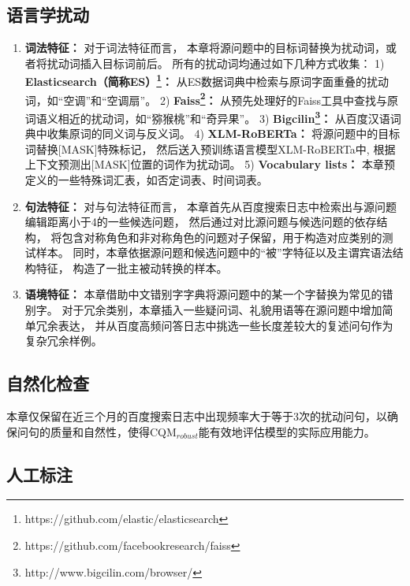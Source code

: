 \subsection{语言学扰动}

\begin{enumerate}
\item \textbf{词法特征：}
对于词法特征而言，
本章将源问题中的目标词替换为扰动词，或者将扰动词插入目标词前后。
所有的扰动词均通过如下几种方式收集：  
1) \textbf{Elasticsearch（简称ES）\footnote{https://github.com/elastic/elasticsearch}：}
从ES数据词典中检索与原词字面重叠的扰动词，如{\kai“空调”}和{\kai“空调扇”}。
2) \textbf{Faiss\footnote{https://github.com/facebookresearch/faiss}：}
从预先处理好的Faiss工具中查找与原词语义相近的扰动词，如{\kai“猕猴桃”}和{\kai“奇异果”}。
3) \textbf{Bigcilin\footnote{http://www.bigcilin.com/browser/}：}
从百度汉语词典中收集原词的同义词与反义词。
4) \textbf{XLM-RoBERTa\cite{conneau2019unsupervised}：}
将源问题中的目标词替换[MASK]特殊标记，
然后送入预训练语言模型XLM-RoBERTa中,
根据上下文预测出[MASK]位置的词作为扰动词。
5) \textbf{Vocabulary lists：}
本章预定义的一些特殊词汇表，如否定词表、时间词表。

\item \textbf{句法特征：}
对与句法特征而言，
本章首先从百度搜索日志中检索出与源问题编辑距离小于4的一些候选问题，
然后通过对比源问题与候选问题的依存结构，
将包含对称角色和非对称角色的问题对子保留，用于构造对应类别的测试样本。
同时，本章依据源问题和候选问题中的{\kai“被”}字特征以及主谓宾语法结构特征，
构造了一批主被动转换的样本。

\item \textbf{语境特征：}
本章借助中文错别字字典将源问题中的某一个字替换为常见的错别字。
对于冗余类别，本章插入一些疑问词、礼貌用语等在源问题中增加简单冗余表达，
并从百度高频问答日志中挑选一些长度差较大的复述问句作为复杂冗余样例。
\end{enumerate}


\subsection{自然化检查}

本章仅保留在近三个月的百度搜索日志中出现频率大于等于3次的扰动问句，以确保问句的质量和自然性，使得CQM$_{robust}$能有效地评估模型的实际应用能力。

\subsection{人工标注}

